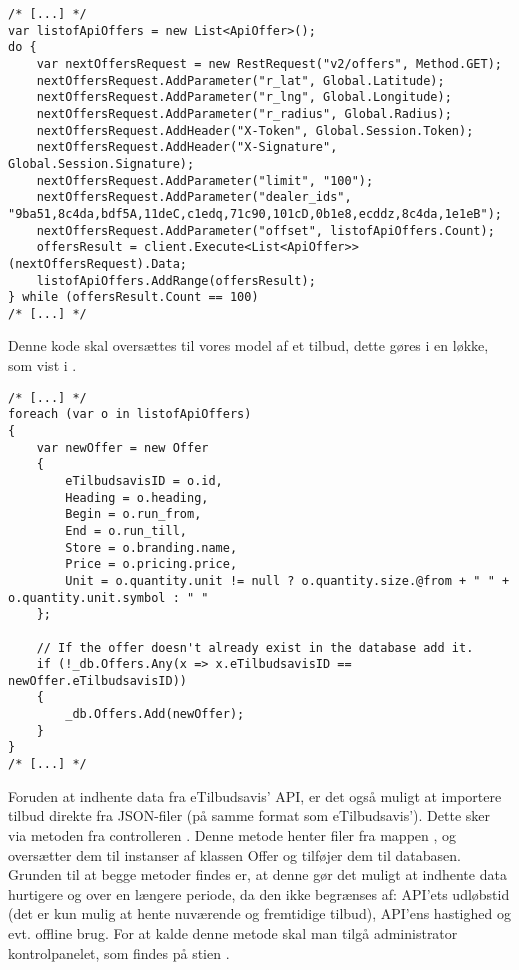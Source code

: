\begin{lstlisting}[caption={C\#-kode som anvender ``/v2/offers'' delen af API'et til at hente tilbud.}, label=apiofferscs]
/* [...] */
var listofApiOffers = new List<ApiOffer>();
do {
    var nextOffersRequest = new RestRequest("v2/offers", Method.GET);
    nextOffersRequest.AddParameter("r_lat", Global.Latitude);
    nextOffersRequest.AddParameter("r_lng", Global.Longitude);
    nextOffersRequest.AddParameter("r_radius", Global.Radius);
    nextOffersRequest.AddHeader("X-Token", Global.Session.Token);
    nextOffersRequest.AddHeader("X-Signature", Global.Session.Signature);
    nextOffersRequest.AddParameter("limit", "100");
    nextOffersRequest.AddParameter("dealer_ids", "9ba51,8c4da,bdf5A,11deC,c1edq,71c90,101cD,0b1e8,ecddz,8c4da,1e1eB");
    nextOffersRequest.AddParameter("offset", listofApiOffers.Count);
    offersResult = client.Execute<List<ApiOffer>>(nextOffersRequest).Data;
    listofApiOffers.AddRange(offersResult);
} while (offersResult.Count == 100)
/* [...] */
\end{lstlisting}

Denne kode skal oversættes til vores model af et tilbud, dette gøres i en  løkke, som vist i .

\begin{lstlisting}[caption={C\#-kode som bruger API-data til at oprette instanser af Offer-klassen, og tilføjer dem til databasen}, label=apiofferstooffercs]
/* [...] */
foreach (var o in listofApiOffers)
{
    var newOffer = new Offer
    {
        eTilbudsavisID = o.id,
        Heading = o.heading,
        Begin = o.run_from,
        End = o.run_till,
        Store = o.branding.name,
        Price = o.pricing.price,
        Unit = o.quantity.unit != null ? o.quantity.size.@from + " " + o.quantity.unit.symbol : " "
    };

    // If the offer doesn't already exist in the database add it.
    if (!_db.Offers.Any(x => x.eTilbudsavisID == newOffer.eTilbudsavisID))
    {
        _db.Offers.Add(newOffer);
    }
}
/* [...] */
\end{lstlisting}

Foruden at indhente data fra eTilbudsavis' API, er det også muligt at importere tilbud direkte fra JSON-filer (på samme format som eTilbudsavis'). 
Dette sker via metoden  fra controlleren . 
Denne metode henter filer fra mappen , og oversætter dem til instanser af klassen Offer og tilføjer dem til databasen. 
Grunden til at begge metoder findes er, at denne gør det muligt at indhente data hurtigere og over en længere periode, da den ikke begrænses af: API'ets udløbstid (det er kun mulig at hente nuværende og fremtidige tilbud), API'ens hastighed og evt. offline brug. 
For at kalde denne metode skal man tilgå administrator kontrolpanelet, som findes på stien .

